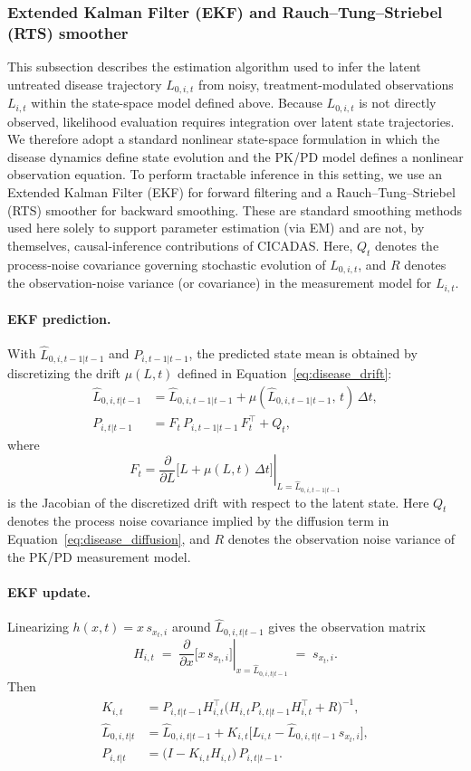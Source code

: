 \subsubsection*{Extended Kalman Filter (EKF) and Rauch--Tung--Striebel (RTS) smoother}
This subsection describes the estimation algorithm used to infer the latent untreated
disease trajectory $L_{0,i,t}$ from noisy, treatment-modulated observations $L_{i,t}$
within the state-space model defined above.
Because $L_{0,i,t}$ is not directly observed, likelihood evaluation requires integration
over latent state trajectories.
We therefore adopt a standard nonlinear state-space formulation in which the disease
dynamics define state evolution and the PK/PD model defines a nonlinear observation equation.
To perform tractable inference in this setting, we use an Extended Kalman Filter (EKF)
for forward filtering and a Rauch--Tung--Striebel (RTS) smoother for backward smoothing.
These are standard smoothing methods used here solely to support parameter estimation
(via EM) and are not, by themselves, causal-inference contributions of CICADAS.
Here, $Q_t$ denotes the process-noise covariance governing stochastic evolution of
$L_{0,i,t}$, and $R$ denotes the observation-noise variance (or covariance) in the
measurement model for $L_{i,t}$.

\paragraph{EKF prediction.}
With $\hat L_{0,i,t-1|t-1}$ and $P_{i,t-1|t-1}$,
the predicted state mean is obtained by discretizing the drift
$\mu(L,t)$ defined in Equation~\eqref{eq:disease_drift}:
\begin{align}
\hat L_{0,i,t|t-1}
&= \hat L_{0,i,t-1|t-1}
   + \mu\!\left(\hat L_{0,i,t-1|t-1},\, t\right)\,\Delta t, \\
P_{i,t|t-1}
&= F_t\, P_{i,t-1|t-1}\, F_t^\top + Q_t,
\end{align}
where
\[
F_t
= \left.\frac{\partial}{\partial L}
\Big[ L + \mu(L,t)\,\Delta t \Big]\right|_{L=\hat L_{0,i,t-1|t-1}}
\]
is the Jacobian of the discretized drift with respect to the latent state. Here $Q_t$ denotes the process noise covariance implied by the diffusion term
in Equation~\eqref{eq:disease_diffusion}, and $R$ denotes the observation noise
variance of the PK/PD measurement model.

\paragraph{EKF update.}
Linearizing $h(x,t)=x\,s_{x_t,i}$ around $\hat L_{0,i,t|t-1}$ gives the observation matrix
\[
H_{i,t} \;=\; \left.\frac{\partial}{\partial x} \big[x\, s_{x_t,i}\big]\right|_{x=\hat L_{0,i,t|t-1}} \;=\; s_{x_t,i}.
\]
Then
\begin{align}
K_{i,t} &= P_{i,t|t-1} H_{i,t}^\top \Big(H_{i,t} P_{i,t|t-1} H_{i,t}^\top + R\Big)^{-1}, \\
\hat L_{0,i,t|t} &= \hat L_{0,i,t|t-1} + K_{i,t}\Big[L_{i,t} - \hat L_{0,i,t|t-1}\, s_{x_t,i}\Big], \\
P_{i,t|t} &= \big(I - K_{i,t} H_{i,t}\big)\, P_{i,t|t-1}.
\end{align}

